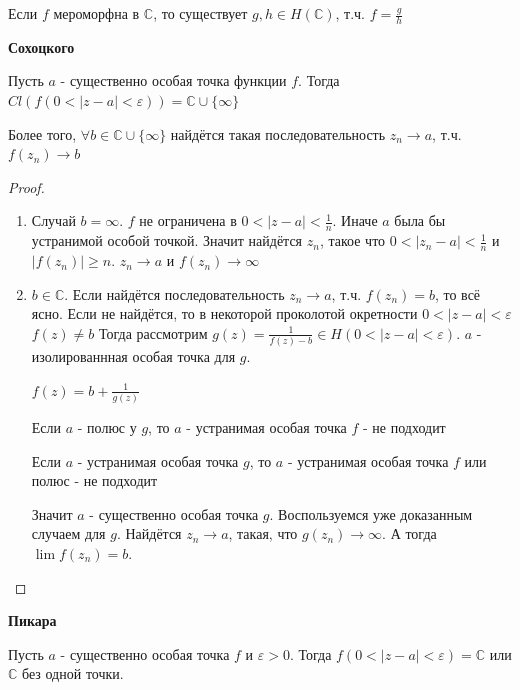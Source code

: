 \begin{statement}
    Если $f$ мероморфна в $\mathbb{C}$, то существует $g, h \in H(\mathbb{C})$, т.ч. $f = \frac{g}{h}$
\end{statement}

\begin{theorem}
    \textbf{Сохоцкого}

    Пусть $a$ - существенно особая точка функции $f$. Тогда $Cl \left(f(0 < |z - a| < \varepsilon)\right) = \mathbb{C} \cup \{ \infty \}$ 

    Более того, $\forall b \in \mathbb{C} \cup \{ \infty \}$ найдётся такая последовательность
    $z_n \rightarrow a$, т.ч. $f(z_n) \rightarrow b$
\end{theorem}

\begin{proof}
    \begin{enumerate}
        \item Случай $b = \infty$. $f$ не ограничена в $0 < |z - a| < \frac{1}{n}$. Иначе $a$ была бы устранимой особой точкой.
        Значит найдётся $z_n$, такое что $0 < |z_n - a| < \frac{1}{n}$ и $|f(z_n)| \geqslant n$.
        $z_n \rightarrow a$ и $f(z_n) \rightarrow \infty$
        \item $b \in \mathbb{C}$. Если найдётся последовательность $z_n \rightarrow a$, т.ч. $f(z_n) = b$, то всё ясно.
        Если не найдётся, то в некоторой проколотой окретности $0 < |z - a| < \varepsilon $ $f(z) \neq b$
        Тогда рассмотрим $g(z) = \frac{1}{f(z) - b} \in H(0 < |z - a| < \varepsilon)$. 
        $a$ - изолированнная особая точка для $g$.

        $f(z) = b + \frac{1}{g(z)}$

        Если $a$ - полюс у $g$, то $a$ - устранимая особая точка $f$ - не подходит

        Если $a$ - устранимая особая точка $g$, то $a$ - устранимая особая точка $f$ или полюс - не подходит

        Значит $a$ - существенно особая точка $g$. Воспользуемся уже доказанным случаем для $g$.
        Найдётся $z_n \rightarrow a$, такая, что $g(z_n) \rightarrow \infty$. А тогда
        $\lim f(z_n) = b$.
    \end{enumerate}
\end{proof}

\begin{theorem}
    \textbf{Пикара}

    Пусть $a$ - существенно особая точка $f$ и $\varepsilon > 0$. Тогда 
    $f(0 < |z - a| < \varepsilon) = \mathbb{C}$ или $\mathbb{C}$ без одной точки.
\end{theorem}

